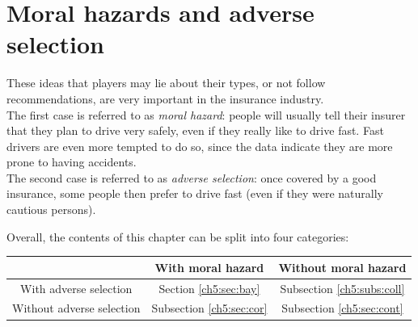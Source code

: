 \section{Moral hazards and adverse selection}

These ideas that players may lie about their types, or not follow recommendations, are very important in the insurance industry.\\
 The first case is referred to as \emph{moral hazard}: people will usually tell their insurer that they plan to drive very safely, even if they really like to drive fast. Fast drivers are even more tempted to do so, since the data indicate they are more prone to having accidents.\\
  The second case is referred to as \emph{adverse selection}: once covered by a good insurance, some people then prefer to drive fast (even if they were naturally cautious persons).
  
  Overall, the contents of this chapter can be split into four categories:
  
  \begin{tabular}{c | c | c}
  & With moral hazard & Without moral hazard \\
  \hline
  With adverse selection   & Section \ref{ch5:sec:bay} &  Subsection \ref{ch5:subs:coll} \\
  \hline
  Without adverse selection  & Subsection \ref{ch5:sec:cor}  & Subsection \ref{ch5:sec:cont} \\
  \end{tabular}  
 

 
  
 



\ifx \globalmark \undefined %


	
\else 
	
\fi